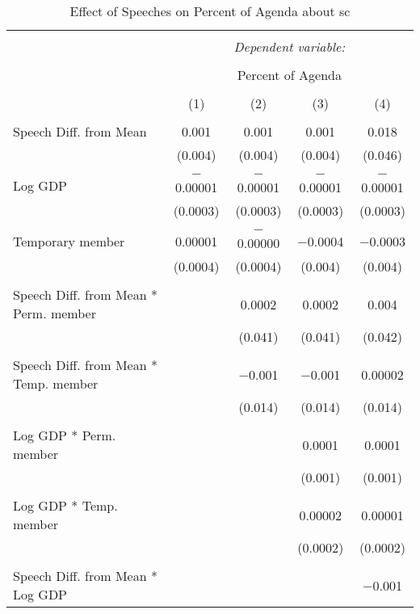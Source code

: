 
\begin{table}[!htbp] \centering 
  \caption{Effect of Speeches on Percent of Agenda about sc} 
  \label{} 
\begin{tabular}{@{\extracolsep{5pt}}lcccc} 
\\[-1.8ex]\hline 
\hline \\[-1.8ex] 
 & \multicolumn{4}{c}{\textit{Dependent variable:}} \\ 
\cline{2-5} 
\\[-1.8ex] & \multicolumn{4}{c}{Percent of Agenda} \\ 
\\[-1.8ex] & (1) & (2) & (3) & (4)\\ 
\hline \\[-1.8ex] 
 Speech Diff. from Mean & 0.001 & 0.001 & 0.001 & 0.018 \\ 
  & (0.004) & (0.004) & (0.004) & (0.046) \\ 
  & & & & \\ 
 Log GDP & $-$0.00001 & $-$0.00001 & $-$0.00001 & $-$0.00001 \\ 
  & (0.0003) & (0.0003) & (0.0003) & (0.0003) \\ 
  & & & & \\ 
 Temporary member & 0.00001 & $-$0.00000 & $-$0.0004 & $-$0.0003 \\ 
  & (0.0004) & (0.0004) & (0.004) & (0.004) \\ 
  & & & & \\ 
 Speech Diff. from Mean * Perm. member &  & 0.0002 & 0.0002 & 0.004 \\ 
  &  & (0.041) & (0.041) & (0.042) \\ 
  & & & & \\ 
 Speech Diff. from Mean * Temp. member &  & $-$0.001 & $-$0.001 & 0.00002 \\ 
  &  & (0.014) & (0.014) & (0.014) \\ 
  & & & & \\ 
 Log GDP * Perm. member &  &  & 0.0001 & 0.0001 \\ 
  &  &  & (0.001) & (0.001) \\ 
  & & & & \\ 
 Log GDP * Temp. member &  &  & 0.00002 & 0.00001 \\ 
  &  &  & (0.0002) & (0.0002) \\ 
  & & & & \\ 
 Speech Diff. from Mean * Log GDP &  &  &  & $-$0.001 \\ 

\end{tabular}
\end{table}
